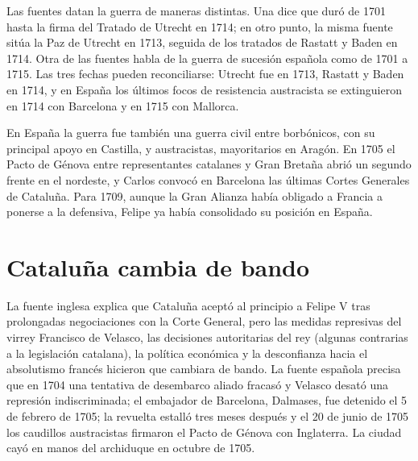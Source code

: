 \documentclass{book}
\begin{document}
Las fuentes datan la guerra de maneras distintas. Una dice que duró de 1701 hasta la firma del Tratado de Utrecht en 1714; en otro punto, la misma fuente sitúa la Paz de Utrecht en 1713, seguida de los tratados de Rastatt y Baden en 1714. Otra de las fuentes habla de la guerra de sucesión española como de 1701 a 1715. Las tres fechas pueden reconciliarse: Utrecht fue en 1713, Rastatt y Baden en 1714, y en España los últimos focos de resistencia austracista se extinguieron en 1714 con Barcelona y en 1715 con Mallorca.


En España la guerra fue también una guerra civil entre borbónicos, con su principal apoyo en Castilla, y austracistas, mayoritarios en Aragón. En 1705 el Pacto de Génova entre representantes catalanes y Gran Bretaña abrió un segundo frente en el nordeste, y Carlos convocó en Barcelona las últimas Cortes Generales de Cataluña. Para 1709, aunque la Gran Alianza había obligado a Francia a ponerse a la defensiva, Felipe ya había consolidado su posición en España.


\section{Cataluña cambia de bando}

La fuente inglesa explica que Cataluña aceptó al principio a Felipe V tras prolongadas negociaciones con la Corte General, pero las medidas represivas del virrey Francisco de Velasco, las decisiones autoritarias del rey (algunas contrarias a la legislación catalana), la política económica y la desconfianza hacia el absolutismo francés hicieron que cambiara de bando. La fuente española precisa que en 1704 una tentativa de desembarco aliado fracasó y Velasco desató una represión indiscriminada; el embajador de Barcelona, Dalmases, fue detenido el 5 de febrero de 1705; la revuelta estalló tres meses después y el 20 de junio de 1705 los caudillos austracistas firmaron el Pacto de Génova con Inglaterra. La ciudad cayó en manos del archiduque en octubre de 1705.

\end{document}
